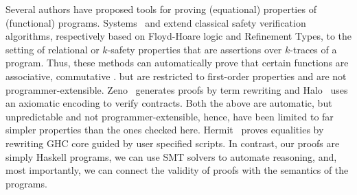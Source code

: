 %
Several authors have proposed tools for proving
(equational) properties of (functional) programs.
%
Systems~\citep{sousa16} and \citep{KobayashiRelational15}
extend classical safety verification algorithms,
respectively based on Floyd-Hoare logic and Refinement Types,
to the setting of relational or $k$-safety properties
that are assertions over $k$-traces of a program.
%
Thus, these methods can automatically prove that
certain functions are associative, commutative \etc.
but are restricted to first-order properties and
are not programmer-extensible.
%
Zeno~\citep{ZENO} generates proofs by term
rewriting and Halo~\citep{HALO} uses an axiomatic
encoding to verify contracts.
%
Both the above are automatic, but unpredictable and not
programmer-extensible, hence, have been limited to
far simpler properties than the ones checked here.
%
Hermit~\citep{Farmer15} proves equalities by rewriting
GHC core guided by user specified scripts.
%
In contrast, our proofs are simply Haskell programs,
we can use SMT solvers to automate reasoning, and,
most importantly, we can connect the validity of
proofs with the semantics of the programs.

%
%
